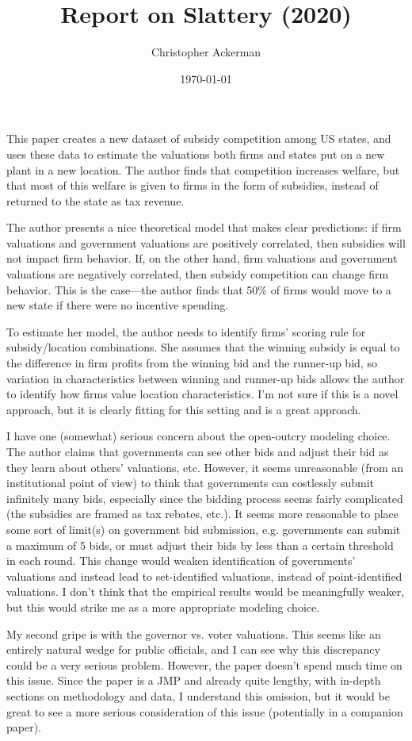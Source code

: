 \documentclass[dvipsnames]{article}
\title{Report on Slattery (2020)}
\author{Christopher Ackerman}
\date{\today}
\begin{document}
\maketitle
This paper creates a new dataset of subsidy competition among US states, and uses these data to estimate the valuations both firms and states put on a new plant in a new location. The author finds that competition increases welfare, but that most of this welfare is given to firms in the form of subsidies, instead of returned to the state as tax revenue.

The author presents a nice theoretical model that makes clear predictions: if firm valuations and government valuations are positively correlated, then subsidies will not impact firm behavior. If, on the other hand, firm valuations and government valuations are negatively correlated, then subsidy competition can change firm behavior. This is the case---the author finds that 50\% of firms would move to a new state if there were no incentive spending.

To estimate her model, the author needs to identify firms' scoring rule for subsidy/location combinations. She assumes that the winning subsidy is equal to the difference in firm profits from the winning bid and the runner-up bid, so variation in characteristics between winning and runner-up bids allows the author to identify how firms value location characteristics. I'm not sure if this is a novel approach, but it is clearly fitting for this setting and is a great approach.

I have one (somewhat) serious concern about the open-outcry modeling choice. The author claims that governments can see other bids and adjust their bid as they learn about others' valuations, etc. However, it seems unreasonable (from an institutional point of view) to think that governments can costlessly submit infinitely many bids, especially since the bidding process seems fairly complicated (the subsidies are framed as tax rebates, etc.). It seems more reasonable to place some sort of limit(s) on government bid submission, e.g. governments can submit a maximum of 5 bids, or must adjust their bids by less than a certain threshold in each round. This change would weaken identification of governments' valuations and instead lead to set-identified valuations, instead of point-identified valuations. I don't think that the empirical results would be meaningfully weaker, but this would strike me as a more appropriate modeling choice.

My second gripe is with the governor vs. voter valuations. This seems like an entirely natural wedge for public officials, and I can see why this discrepancy could be a very serious problem. However, the paper doesn't spend much time on this issue. Since the paper is a JMP and already quite lengthy, with in-depth sections on methodology and data, I understand this omission, but it would be great to see a more serious consideration of this issue (potentially in a companion paper).
\end{document}
